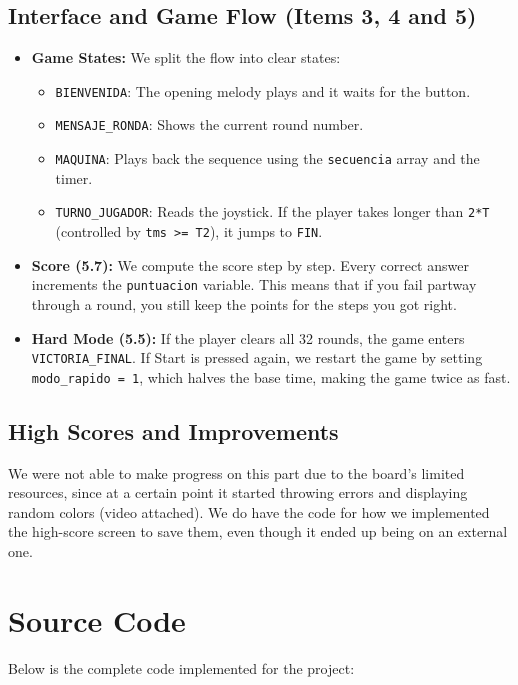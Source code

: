 \documentclass[11pt]{article}
\begin{document}
\subsection{Interface and Game Flow (Items 3, 4 and 5)}

\begin{itemize}
    \item \textbf{Game States:} We split the flow into clear states:
    \begin{itemize}
        \item \texttt{BIENVENIDA}: The opening melody plays and it waits for the button.
        \item \texttt{MENSAJE\_RONDA}: Shows the current round number.
        \item \texttt{MAQUINA}: Plays back the sequence using the \texttt{secuencia} array and the timer.
        \item \texttt{TURNO\_JUGADOR}: Reads the joystick. If the player takes longer than \texttt{2*T} (controlled by \texttt{tms >= T2}), it jumps to \texttt{FIN}.
    \end{itemize}

    \item \textbf{Score (5.7):} We compute the score step by step. Every correct answer increments the \texttt{puntuacion} variable. This means that if you fail partway through a round, you still keep the points for the steps you got right.

    \item \textbf{Hard Mode (5.5):} If the player clears all 32 rounds, the game enters \texttt{VICTORIA\_FINAL}. If Start is pressed again, we restart the game by setting \texttt{modo\_rapido = 1}, which halves the base time, making the game twice as fast.
\end{itemize}

\subsection{High Scores and Improvements}

We were not able to make progress on this part due to the board's limited resources, since at a certain point it started throwing errors and displaying random colors (video attached). We do have the code for how we implemented the high-score screen to save them, even though it ended up being on an external one.

\section{Source Code}

Below is the complete code implemented for the project:


\end{document}
